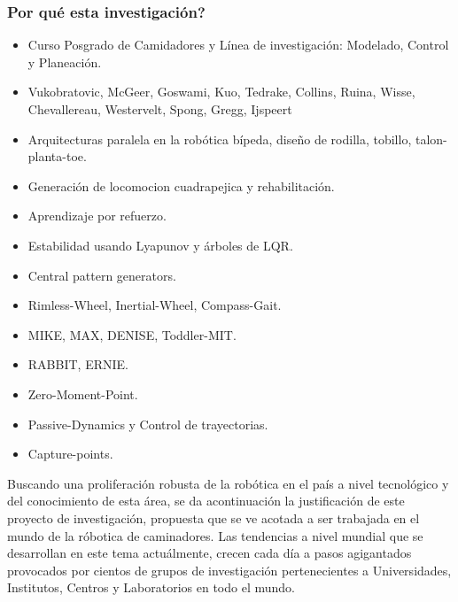 {\begin{frame}
{\begin{columns}[T]
\begin{column}{4cm}
{{\begin{center}
            \end{center}
          }
        }
      \end{column}
    \end{columns}
  }
\end{frame}
\begin{frame}
  \frametitle{Por qu\'e esta investigaci\'on?}
  \begin{itemize}
  \item Curso Posgrado de Camidadores y L\'inea de investigaci\'on: Modelado, Control y Planeaci\'on.
  \item Vukobratovic, McGeer, Goswami, Kuo, Tedrake, Collins, Ruina, Wisse, Chevallereau, Westervelt, Spong, Gregg, Ijspeert
  \item Arquitecturas paralela en la rob\'otica b\'ipeda, dise\~no de rodilla, tobillo, talon-planta-toe.
  \item Generaci\'on de locomocion cuadrapejica y rehabilitaci\'on.
  \item Aprendizaje por refuerzo.
  \item Estabilidad usando Lyapunov y \'arboles de LQR.
  \item Central pattern generators.
  \item Rimless-Wheel, Inertial-Wheel, Compass-Gait. 
  \item MIKE, MAX, DENISE, Toddler-MIT.
  \item RABBIT, ERNIE.
  \item Zero-Moment-Point.
  \item Passive-Dynamics y Control de trayectorias.
  \item Capture-points.
  \end{itemize}
\end{frame}
}
Buscando una proliferaci\'on robusta de la rob\'otica en el pa\'is a nivel tecnol\'ogico y del conocimiento de esta \'area, se da acontinuaci\'on la justificaci\'on de este proyecto de investigaci\'on, propuesta que se ve acotada a ser trabajada en el mundo de la r\'obotica de caminadores.  Las tendencias a nivel mundial que se desarrollan en este tema actu\'almente, crecen cada d\'ia a pasos agigantados provocados por cientos de grupos de investigaci\'on pertenecientes a Universidades, Institutos, Centros y Laboratorios en todo el mundo.\par

